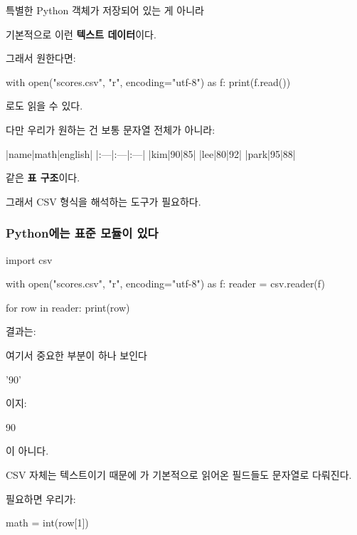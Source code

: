 특별한 Python 객체가 저장되어 있는 게 아니라

기본적으로 이런 \textbf{텍스트 데이터}이다.

그래서 원한다면:

\begin{dhkcode}
with open("scores.csv", "r", encoding="utf-8") as f:
    print(f.read())
\end{dhkcode}

로도 읽을 수 있다.

다만 우리가 원하는 건 보통 문자열 전체가 아니라:

\begin{dhktable}
|name|math|english|
|:---|:---|:---|
|kim|90|85|
|lee|80|92|
|park|95|88|
\end{dhktable}

같은 \textbf{표 구조}이다.

그래서 CSV 형식을 해석하는 도구가 필요하다.

\subsubsection{Python에는 표준 모듈이 있다}

\begin{dhkcode}
import csv

with open("scores.csv", "r", encoding="utf-8") as f:
    reader = csv.reader(f)

    for row in reader:
        print(row)
\end{dhkcode}

결과는:

\begin{dhkzsh}
\end{dhkzsh}

여기서 중요한 부분이 하나 보인다

\begin{dhkzsh}
'90'
\end{dhkzsh}

이지:

\begin{dhkzsh}
90
\end{dhkzsh}

이 아니다.

CSV 자체는 텍스트이기 때문에 가 기본적으로 읽어온 필드들도 문자열로 다뤄진다.

필요하면 우리가:

\begin{dhkcode}
math = int(row[1])
\end{dhkcode}

